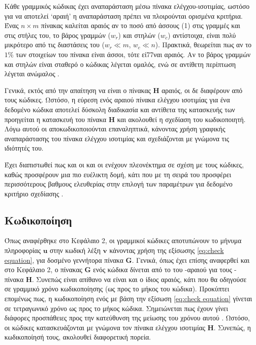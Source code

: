 Κάθε γραμμικός κώδικας έχει αναπαράσταση μέσω πίνακα ελέγχου-ισοτιμίας, ωστόσο για να αποτελεί \enquote*{αραιή} η αναπαράσταση πρέπει να πλοιρούνται ορισμένα κριτήρια. Ένας $n\times m$ πίνακας καλείται αραιός αν το ποσό από άσσους (1) στις γραμμές και στις στήλες του, το βάρος γραμμών ($w_r$) και στηλών ($w_c$) αντίστοιχα, είναι πολύ μικρότερο από τις διαστάσεις του ($w_r\ll m$, $w_c\ll n$). Πρακτικά, θεωρείται πως αν το $1\%$ των στοιχείων του πίνακα είναι άσσοι, τότε εί77ναι αραιός. Αν το βάρος γραμμών και στηλών είναι σταθερό ο κώδικας  λέγεται ομαλός, ενώ σε αντίθετη περίπτωση λέγεται ανώμαλος \cite{ta2013tutorial}.

Γενικά, εκτός από την απαίτηση να είναι ο πίνακας $\mathbf{H}$ αραιός, οι  δε διαφέρουν από τους  κώδικες. Ωστόσο, η εύρεση ενός αραιού πίνακα ελέγχου ισοτιμίας για ένα δεδομένο  κώδικα αποτελεί δύσκολη διαδικασία και αντίθετα της κατασκευής των  προηγείται η κατασκευή του πίνακα $\mathbf{H}$ και ακολουθεί η σχεδίαση του κωδικοποιητή. Λόγω αυτού οι  αποκωδικοποιούνται επαναληπτικά, κάνοντας χρήση γραφικής αναπαράστασης του πίνακα ελέγχου ισοτιμίας και σχεδιάζονται με γνώμονα τις ιδιότητές του.

Έχει διαπιστωθεί πως και οι  και οι   ενέχουν πλεονέκτημα σε σχέση με τους  κώδικες, καθώς προσφέρουν μια πιο ευέλικτη δομή, κάτι που με τη σειρά του προσφέρει περισσότερους βαθμους ελευθερίας στην επιλογή των παραμέτρων για δεδομένο κριτήριο σχεδίασης \cite{johnson2009iterative}.

\subsection{Κωδικοποίηση }

Όπως αναφέρθηκε στο Κεφάλαιο 2, οι γραμμικοί  κώδικες αποτυπώνουν το μήνυμα πληροφορίας $\mathbf{u}$ στην κωδική λέξη $\mathbf{v}$ κάνοντας χρήση της εξίσωσης \ref{eq:check equation}, για δοσμένο γεννήτορα πίνακα $\mathbf{G}$. Γενικά, όπως έχει επίσης αναφερθεί και στο Κεφάλαιο 2, ο πίνακας $\mathbf{G}$ ενός κώδικα δίνεται από το  του -αραιού για τους - πίνακα $\mathbf{H}$. Συνεπώς είναι απίθανο να είναι και ο ίδιος αραιός, κάτι που θα οδηγούσε σε γραμμικό χρόνο κωδικοποίησης (ως προς το μήκος του κώδικα). Προκύπτει επομένως πως, η κωδικοποίηση ενός  με βάση την εξίσωση \ref{eq:check equation} γίνεται σε τετραγωνικό χρόνο ως προς το μήκος κώδικα. Σημειώνεται πως έχουν γίνει διάφορες προσπάθειες προς την κατεύθυνση της μείωσης του χρόνου αυτού \cite{ta2013tutorial}. Ωστόσο, οι κώδικες  κατασκευάζονται με γνώμονα τον πίνακα ελέγχου ισοτιμίας $\mathbf{H}$. Συνεπώς, η κωδικοποίησή τους, ακολουθεί διαφορετική πορεία. 

